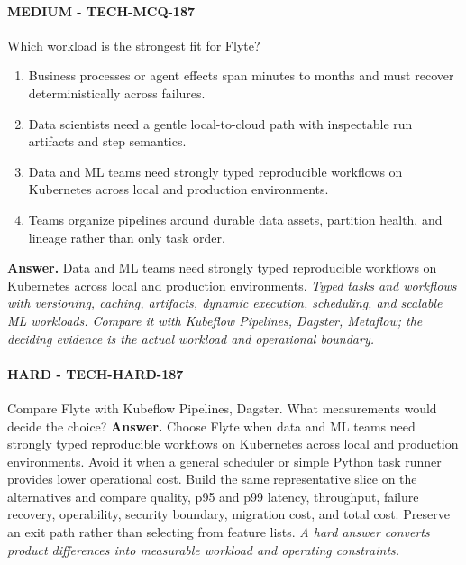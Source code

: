 \paragraph{MEDIUM - TECH-MCQ-187} Which workload is the strongest fit for Flyte?
\begin{enumerate}[label=\Alph*.]
\item Business processes or agent effects span minutes to months and must recover deterministically across failures.
\item Data scientists need a gentle local-to-cloud path with inspectable run artifacts and step semantics.
\item Data and ML teams need strongly typed reproducible workflows on Kubernetes across local and production environments.
\item Teams organize pipelines around durable data assets, partition health, and lineage rather than only task order.
\end{enumerate}
\textbf{Answer.} Data and ML teams need strongly typed reproducible workflows on Kubernetes across local and production environments.
\textit{Typed tasks and workflows with versioning, caching, artifacts, dynamic execution, scheduling, and scalable ML workloads. Compare it with Kubeflow Pipelines, Dagster, Metaflow; the deciding evidence is the actual workload and operational boundary.}
\paragraph{HARD - TECH-HARD-187} Compare Flyte with Kubeflow Pipelines, Dagster. What measurements would decide the choice?
\textbf{Answer.} Choose Flyte when data and ML teams need strongly typed reproducible workflows on Kubernetes across local and production environments. Avoid it when a general scheduler or simple Python task runner provides lower operational cost. Build the same representative slice on the alternatives and compare quality, p95 and p99 latency, throughput, failure recovery, operability, security boundary, migration cost, and total cost. Preserve an exit path rather than selecting from feature lists.
\textit{A hard answer converts product differences into measurable workload and operating constraints.}
